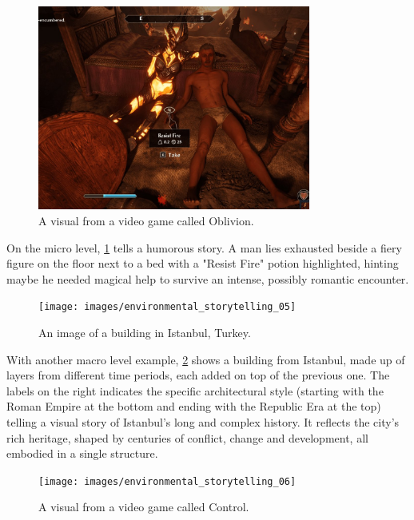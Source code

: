     \begin{figure}[H]
    \centering
    \includegraphics[width=0.8\textwidth]{images/environmental_storytelling_04}
    \caption{A visual from a video game called Oblivion.}
    \label{fig:ES_02}
    \end{figure}

    On the micro level, \ref{fig:ES_02} tells a humorous story. A man lies exhausted beside a fiery figure on the floor next to a bed with a "Resist Fire" potion highlighted, hinting maybe he needed magical help to survive an intense, possibly romantic encounter.\par

    \begin{figure}[H]
    \centering
    \texttt{[image: images/environmental\_storytelling\_05]}
    \caption{An image of a building in Istanbul, Turkey.}
    \label{fig:ES_03}
    \end{figure}

    With another macro level example, \ref{fig:ES_03} shows a building from Istanbul, made up of layers from different time periods, each added on top of the previous one. The labels on the right indicates the specific architectural style (starting with the Roman Empire at the bottom and ending with the Republic Era at the top) telling a visual story of Istanbul’s long and complex history. It reflects the city’s rich heritage, shaped by centuries of conflict, change and development, all embodied in a single structure.\par

    \begin{figure}[H]
    \centering
    \texttt{[image: images/environmental\_storytelling\_06]}
    \caption{A visual from a video game called Control.}
    \label{fig:ES_04}
    \end{figure}

